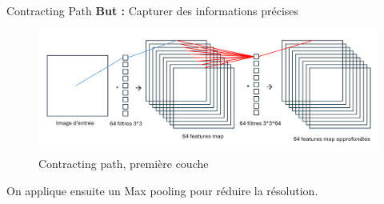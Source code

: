\documentclass{beamer}
\begin{document}
        \begin{frame}{Contracting Path}
        \textbf{But :} Capturer des informations précises
        \begin{figure}
            \centering
            \includegraphics[width=1.0\linewidth]{Couches_convolutions.png}
            \caption{Contracting path, première couche}
            \label{fig:enter-label}
        \end{figure}
        On applique ensuite un Max pooling pour réduire la résolution.
        \end{frame}
\end{document}
